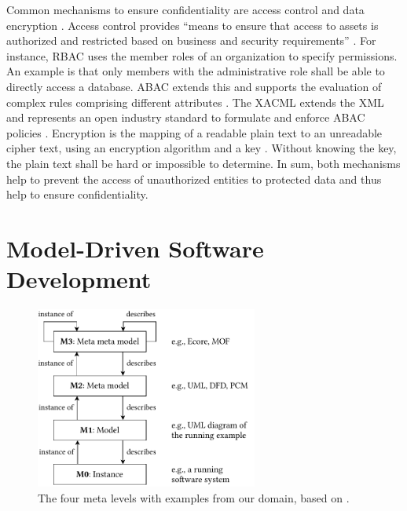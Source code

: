 Common mechanisms to ensure confidentiality are access control and data encryption \cite{schumacher_security_2013}.
Access control provides \enquote{means to ensure that access to assets is authorized and restricted based on business and security requirements} \cite{international_organization_for_standardization_isoiec_2018}.
For instance, \acf{RBAC} uses the member roles of an organization to specify permissions.
An example is that only members with the administrative role shall be able to directly access a database.
\acf{ABAC} extends this and supports the evaluation of complex rules comprising different attributes \cite{hu_guide_2014}.
The \acf{XACML} extends the \acf{XML} and represents an open industry standard to formulate and enforce \ac{ABAC} policies \cite{oasis_extensible_2013}.
Encryption is the mapping of a readable plain text to an unreadable cipher text, using an encryption algorithm and a key \cite{bauer_encryption_2005}.
Without knowing the key, the plain text shall be hard or impossible to determine.
In sum, both mechanisms help to prevent the access of unauthorized entities to protected data and thus help to ensure confidentiality. 




\section{Model-Driven Software Development}%
\label{sec:foundations:mds}

\begin{figure}[b]
    \centering
    \includegraphics[width=0.65\textwidth]{figures/chapter2/metalevels.pdf}
    \caption{The four meta levels with examples from our domain, based on \textcite{stahl_model-driven_2006}.}
    \label{fig:foundations:metalevels}
\end{figure}

